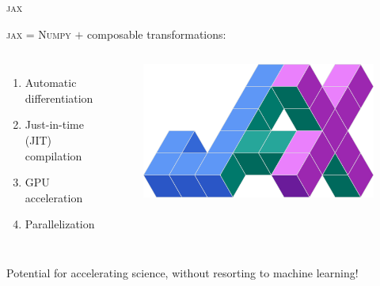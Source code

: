 \documentclass[usenames,dvipsnames,t]{beamer}
\begin{document}
\begin{frame}{\textsc{jax}}

  \def\x{4mm}
  \def\y{2mm}
  \def\z{1cm}
  
  
  
  \textsc{jax} = \textsc{Numpy} $+$ composable transformations: 
  \begin{columns}
    \begin{enumerate}
      \item Automatic differentiation
      
      \vspace{\x}
      
      \item Just-in-time (JIT) compilation
      
      \vspace{\x}
      
      \item GPU acceleration
      
      \vspace{\x}
      
      \item Parallelization
  \end{enumerate}
  \begin{figure}
    \includegraphics[width=\textwidth]{Figures/jax.png}
  \end{figure}
\end{columns}

\vspace{\z}

Potential for accelerating science, without resorting to machine learning!




\end{frame}  
\end{document}
